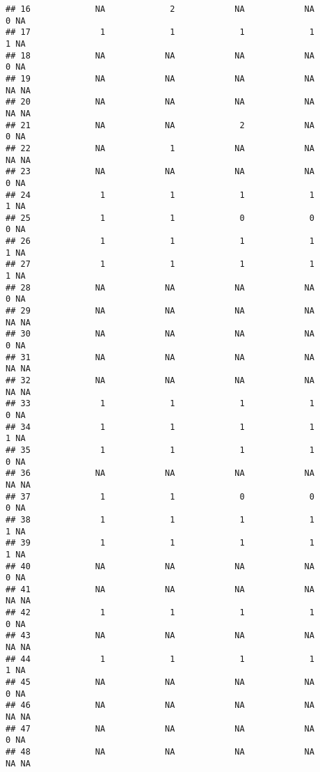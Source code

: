 \documentclass[
]{article}
\begin{document}
\begin{verbatim}
## 16             NA             2            NA            NA             0 NA
## 17              1             1             1             1             1 NA
## 18             NA            NA            NA            NA             0 NA
## 19             NA            NA            NA            NA            NA NA
## 20             NA            NA            NA            NA            NA NA
## 21             NA            NA             2            NA             0 NA
## 22             NA             1            NA            NA            NA NA
## 23             NA            NA            NA            NA             0 NA
## 24              1             1             1             1             1 NA
## 25              1             1             0             0             0 NA
## 26              1             1             1             1             1 NA
## 27              1             1             1             1             1 NA
## 28             NA            NA            NA            NA             0 NA
## 29             NA            NA            NA            NA            NA NA
## 30             NA            NA            NA            NA             0 NA
## 31             NA            NA            NA            NA            NA NA
## 32             NA            NA            NA            NA            NA NA
## 33              1             1             1             1             0 NA
## 34              1             1             1             1             1 NA
## 35              1             1             1             1             0 NA
## 36             NA            NA            NA            NA            NA NA
## 37              1             1             0             0             0 NA
## 38              1             1             1             1             1 NA
## 39              1             1             1             1             1 NA
## 40             NA            NA            NA            NA             0 NA
## 41             NA            NA            NA            NA            NA NA
## 42              1             1             1             1             0 NA
## 43             NA            NA            NA            NA            NA NA
## 44              1             1             1             1             1 NA
## 45             NA            NA            NA            NA             0 NA
## 46             NA            NA            NA            NA            NA NA
## 47             NA            NA            NA            NA             0 NA
## 48             NA            NA            NA            NA            NA NA

\end{verbatim}
\end{document}
